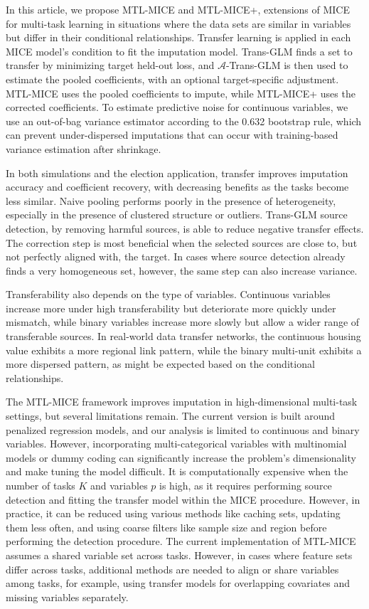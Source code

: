 \documentclass[12pt]{article}
\begin{document}
In this article, we propose MTL-MICE and MTL-MICE+, extensions of MICE for multi-task learning in situations where the data sets are similar in variables but differ in their conditional relationships. Transfer learning is applied in each MICE model’s condition to fit the imputation model. Trans-GLM finds a set to transfer by minimizing target held-out loss, and $\mathcal{A}$-Trans-GLM is then used to estimate the pooled coefficients, with an optional target-specific adjustment. MTL-MICE uses the pooled coefficients to impute, while MTL-MICE+ uses the corrected coefficients. To estimate predictive noise for continuous variables, we use an out-of-bag variance estimator according to the 0.632 bootstrap rule, which can prevent under-dispersed imputations that can occur with training-based variance estimation after shrinkage.

In both simulations and the election application, transfer improves imputation accuracy and coefficient recovery, with decreasing benefits as the tasks become less similar. Naive pooling performs poorly in the presence of heterogeneity, especially in the presence of clustered structure or outliers. Trans-GLM source detection, by removing harmful sources, is able to reduce negative transfer effects. The correction step is most beneficial when the selected sources are close to, but not perfectly aligned with, the target. In cases where source detection already finds a very homogeneous set, however, the same step can also increase variance.

Transferability also depends on the type of variables. Continuous variables increase more under high transferability but deteriorate more quickly under mismatch, while binary variables increase more slowly but allow a wider range of transferable sources. In real-world data transfer networks, the continuous housing value exhibits a more regional link pattern, while the binary multi-unit exhibits a more dispersed pattern, as might be expected based on the conditional relationships.

The MTL-MICE framework improves imputation in high-dimensional multi-task settings, but several limitations remain. The current version is built around penalized regression models, and our analysis is limited to continuous and binary variables. However, incorporating multi-categorical variables with multinomial models or dummy coding can significantly increase the problem's dimensionality and make tuning the model difficult. It is computationally expensive when the number of tasks $K$ and variables $p$ is high, as it requires performing source detection and fitting the transfer model within the MICE procedure. However, in practice, it can be reduced using various methods like caching sets, updating them less often, and using coarse filters like sample size and region before performing the detection procedure. The current implementation of MTL-MICE assumes a shared variable set across tasks. However, in cases where feature sets differ across tasks, additional methods are needed to align or share variables among tasks, for example, using transfer models for overlapping covariates and missing variables separately.
\end{document}
